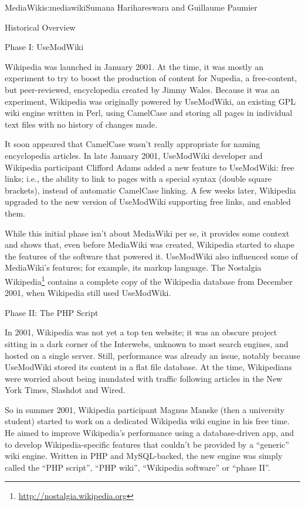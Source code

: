 \begin{aosachapter}{MediaWiki}{s:mediawiki}{Sumana Harihareswara and Guillaume Paumier}
\begin{aosasect1}{Historical Overview}
\begin{aosasect2}{Phase I: UseModWiki}

Wikipedia was launched in January 2001. At the time, it was mostly an
experiment to try to boost the production of content for Nupedia, a
free-content, but peer-reviewed, encyclopedia created by Jimmy
Wales. Because it was an experiment, Wikipedia was originally powered
by UseModWiki, an existing GPL wiki engine written in Perl, using
CamelCase and storing all pages in individual text files with no
history of changes made.

It soon appeared that CamelCase wasn't really appropriate for naming
encyclopedia articles. In late January 2001, UseModWiki developer and
Wikipedia participant Clifford Adams added a new feature to
UseModWiki: free links; i.e., the ability to link to pages with a
special syntax (double square brackets), instead of automatic
CamelCase linking. A few weeks later, Wikipedia upgraded to the new
version of UseModWiki supporting free links, and enabled them.

While this initial phase isn't about MediaWiki per se, it
provides some context and shows that, even before MediaWiki was
created, Wikipedia started to shape the features of the software that
powered it. UseModWiki also influenced some of MediaWiki's features;
for example, its markup language. The Nostalgia
Wikipedia\footnote{\url{http://nostalgia.wikipedia.org}} contains a
complete copy of the Wikipedia database from December 2001, when
Wikipedia still used UseModWiki.

\end{aosasect2}

\begin{aosasect2}{Phase II: The PHP Script}

In 2001, Wikipedia was not yet a top ten website; it was an obscure
project sitting in a dark corner of the Interwebs, unknown to most
search engines, and hosted on a single server. Still, performance was
already an issue, notably because UseModWiki stored its content in a
flat file database. At the time, Wikipedians were worried about being
inundated with traffic following articles in the New York Times,
Slashdot and Wired.

So in summer 2001, Wikipedia participant Magnus Manske (then a
university student) started to work on a dedicated Wikipedia wiki
engine in his free time. He aimed to improve Wikipedia's performance
using a database-driven app, and to develop
Wikipedia-specific features that couldn't be provided by a ``generic''
wiki engine. Written in PHP and MySQL-backed, the new engine was
simply called the ``PHP script'', ``PHP wiki'', ``Wikipedia software'' or
``phase II''.


\end{aosasect2}
\end{aosasect1}
\end{aosachapter}
